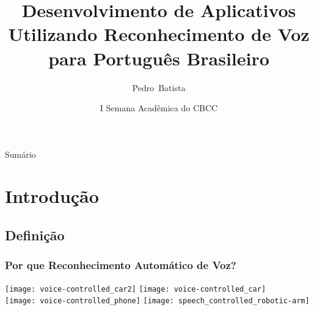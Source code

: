 \documentclass{beamer}
\title[Reconhecimento de Voz para Português Brasileiro] %
{Desenvolvimento de Aplicativos Utilizando Reconhecimento de Voz para Português Brasileiro}
\author%
{Pedro~Batista}%
\institute %
{
   Laboratório de Processamento de Sinais \\
      Universidade Federal do Pará \\
      http://www.laps.ufpa.br%
}
\date[27 de Setembro de 2010] %
{I Semana Acadêmica do CBCC}
\begin{document}
\begin{frame}
\titlepage
\end{frame}

\begin{frame}{Sumário}

\footnotesize
\tableofcontents
\end{frame}



   \section{Introdução}
   \subsection{Definição}

\begin{frame}
   \frametitle{Por que Reconhecimento Automático de Voz?}
   \vspace{0.5cm}
   \texttt{[image: voice-controlled\_car2]}
   \hspace{1cm}
   \texttt{[image: voice-controlled\_car]}\\

   \texttt{[image: voice-controlled\_phone]}
   \texttt{[image: speech\_controlled\_robotic-arm]}
\end{frame}
\end{document}
